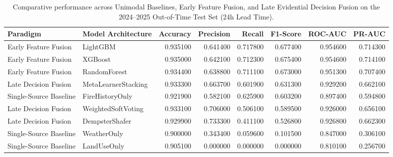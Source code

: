 \begin{table}[htbp]
\caption{Comparative performance across Unimodal Baselines, Early Feature Fusion, and Late Evidential Decision Fusion on the 2024--2025 Out-of-Time Test Set (24h Lead Time).}
\label{tab:model_comparison}
\begin{tabular}{llrrrrrr}
\toprule
Paradigm & Model Architecture & Accuracy & Precision & Recall & F1-Score & ROC-AUC & PR-AUC \\
\midrule
Early Feature Fusion & LightGBM & 0.935100 & 0.641400 & 0.717800 & 0.677400 & 0.954600 & 0.714300 \\
Early Feature Fusion & XGBoost & 0.935000 & 0.642100 & 0.712300 & 0.675400 & 0.954600 & 0.714100 \\
Early Feature Fusion & RandomForest & 0.934400 & 0.638800 & 0.711100 & 0.673000 & 0.951300 & 0.707400 \\
Late Decision Fusion & MetaLearnerStacking & 0.933300 & 0.663700 & 0.601900 & 0.631300 & 0.929200 & 0.662100 \\
Single-Source Baseline & FireHistoryOnly & 0.921900 & 0.582100 & 0.625900 & 0.603200 & 0.897400 & 0.594800 \\
Late Decision Fusion & WeightedSoftVoting & 0.933100 & 0.706000 & 0.506100 & 0.589500 & 0.926000 & 0.656100 \\
Late Decision Fusion & DempsterShafer & 0.929900 & 0.733300 & 0.411100 & 0.526800 & 0.926800 & 0.662300 \\
Single-Source Baseline & WeatherOnly & 0.900000 & 0.343400 & 0.059600 & 0.101500 & 0.847000 & 0.306100 \\
Single-Source Baseline & LandUseOnly & 0.905100 & 0.000000 & 0.000000 & 0.000000 & 0.810100 & 0.256700 \\
\bottomrule
\end{tabular}
\end{table}
